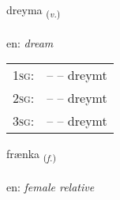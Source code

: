 \documentclass[frontgrid, backgrid]{flacards}\usepackage[]{graphicx}\usepackage[]{color}
\begin{document}
\renewcommand{\flhead}{\vskip5pt \fboxsep=0pt {\small\bfseries\footnotesize Sagnorð | Verb}}
\renewcommand{\fcfoot}{\vskip5pt \fboxsep=0pt \hspace{2pt}{\small\bfseries\footnotesize 2K}}

\renewcommand{\blhead}{\vskip5pt {\small\bfseries\footnotesize Sagnorð | Verb }}
\renewcommand{\bcfoot}{\vskip5pt \hspace{2pt}{\small\bfseries\footnotesize 2K}}


{dreyma \small{\textsubscript{(\textit{v.})}} \\[1ex] %
\textphonetic{[treiːma]} \\
en: \emph{dream} \\  [2ex]
\renewcommand*{\arraystretch}{0.8}
\begin{tabular}{p{1cm}l}
\textsc{1sg}: &  --  -- dreymt \\ 
\textsc{2sg}: &  --  -- dreymt \\ 
\textsc{3sg}: &  --  -- dreymt \\ 
\end{tabular}
}

\renewcommand{\flhead}{\vskip5pt \fboxsep=0pt {\small\bfseries\footnotesize Nafnorð | Noun}}
\renewcommand{\fcfoot}{\vskip5pt \fboxsep=0pt \hspace{2pt}{\small\bfseries\footnotesize 2K}}

\renewcommand{\blhead}{\vskip5pt {\small\bfseries\footnotesize Nafnorð | Noun }}
\renewcommand{\bcfoot}{\vskip5pt \hspace{2pt}{\small\bfseries\footnotesize 2K}}


{frænka \small{\textsubscript{(\textit{f.})}} \\[1ex] %
\textphonetic{[fraiŋ̥ka]} \\
en: \emph{female relative} \\  [2ex]
\renewcommand*{\arraystretch}{0.8}
}
\end{document}
